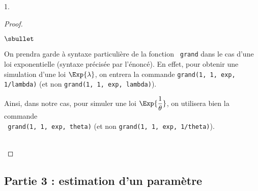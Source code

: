 \documentclass[11pt]{article}%
\begin{document}
\begin{noliste}{1.}
\begin{proof}
\begin{remarkL}{.98}
\begin{noliste}{$\sbullet$}
      \item On prendra garde à syntaxe particulière de la fonction {\tt
          grand} dans le cas d'une loi exponentielle (syntaxe précisée
        par l'énoncé). En effet, pour obtenir une simulation d'une loi
        $\Exp{\lambda}$, on entrera la commande {\tt grand(1, 1,
          \ttq{}exp\ttq{}, 1/lambda)} (et non {\tt grand(1, 1,
          \ttq{}exp\ttq{}, lambda)}).
        
      \item Ainsi, dans notre cas, pour simuler une loi $\Exp{
          \dfrac{1}{\theta}}$, on utilisera bien la commande\\ {\tt
          grand(1, 1, \ttq{}exp\ttq{}, theta)} (et non {\tt grand(1,
          1, \ttq{}exp\ttq{}, 1/theta)}).
      \end{noliste}
    \end{remarkL}~\\[-1.4cm]
  \end{proof}
\end{noliste}


\newpage


\subsection*{Partie 3 : estimation d'un paramètre}
\end{document}
